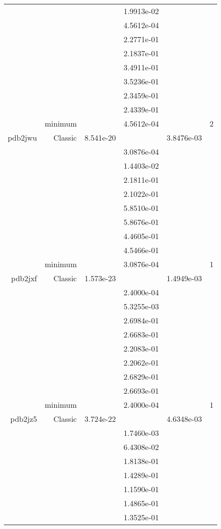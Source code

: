 \begin{xltabular}{\textwidth}{r|rS[table-format=1.3e+2]S[table-format=1.4e+2]S[table-format=1.4e+2]S[table-format=-1.5]}
&  &  & 1.9913e-02 & & \\
&  &  & 4.5612e-04 & & \\
&  &  & 2.2771e-01 & & \\
&  &  & 2.1837e-01 & & \\
&  &  & 3.4911e-01 & & \\
&  &  & 3.5236e-01 & & \\
&  &  & 2.3459e-01 & & \\
&  &  & 2.4339e-01 & & \\
& minimum &  & 4.5612e-04 & & 2 \\  \addlinespace
pdb2jwu & Classic & 8.541e-20 &  & 3.8476e-03 & \\
&  &  & 3.0876e-04 & & \\
&  &  & 1.4403e-02 & & \\
&  &  & 2.1811e-01 & & \\
&  &  & 2.1022e-01 & & \\
&  &  & 5.8510e-01 & & \\
&  &  & 5.8676e-01 & & \\
&  &  & 4.4605e-01 & & \\
&  &  & 4.5466e-01 & & \\
& minimum &  & 3.0876e-04 & & 1 \\  \addlinespace
pdb2jxf & Classic & 1.573e-23 &  & 1.4949e-03 & \\
&  &  & 2.4000e-04 & & \\
&  &  & 5.3255e-03 & & \\
&  &  & 2.6984e-01 & & \\
&  &  & 2.6683e-01 & & \\
&  &  & 2.2083e-01 & & \\
&  &  & 2.2062e-01 & & \\
&  &  & 2.6829e-01 & & \\
&  &  & 2.6693e-01 & & \\
& minimum &  & 2.4000e-04 & & 1 \\  \addlinespace
pdb2jz5 & Classic & 3.724e-22 &  & 4.6348e-03 & \\
&  &  & 1.7460e-03 & & \\
&  &  & 6.4308e-02 & & \\
&  &  & 1.8138e-01 & & \\
&  &  & 1.4289e-01 & & \\
&  &  & 1.1590e-01 & & \\
&  &  & 1.4865e-01 & & \\
&  &  & 1.3525e-01 & & \\

\end{xltabular}
